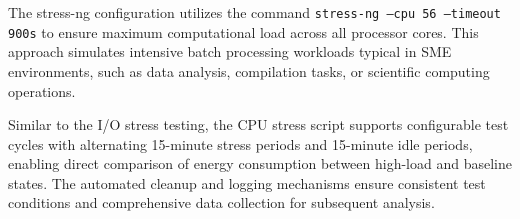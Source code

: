 The stress-ng configuration utilizes the command 
\texttt{stress-ng --cpu 56 --timeout 900s} to ensure maximum computational 
load across all processor cores. This approach simulates intensive batch 
processing workloads typical in SME environments, such as data analysis, 
compilation tasks, or scientific computing operations.

Similar to the I/O stress testing, the CPU stress script supports configurable 
test cycles with alternating 15-minute stress periods and 15-minute idle 
periods, enabling direct comparison of energy consumption between high-load 
and baseline states. The automated cleanup and logging mechanisms ensure 
consistent test conditions and comprehensive data collection for subsequent 
analysis.

